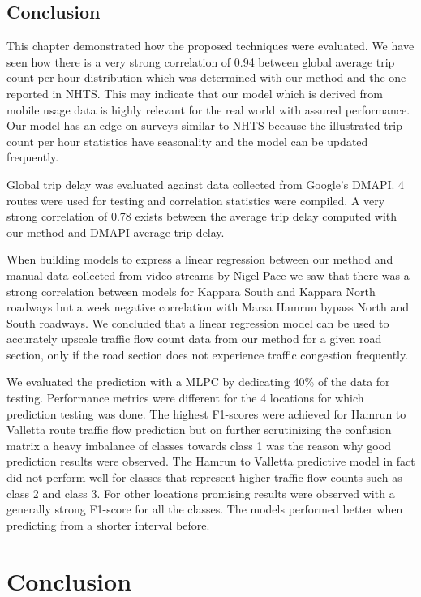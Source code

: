 \documentclass[12pt, a4paper]{report}
\theoremstyle{definition}
\theoremstyle{definition}%
\theoremstyle{definition}%
\theoremstyle{definition}%
\theoremstyle{definition}%
\theoremstyle{definition}%
\begin{document}
\section{Conclusion}

This chapter demonstrated how the proposed techniques were evaluated. We have seen how there is a very strong correlation of 0.94 between global average trip count per hour  distribution which was determined with our method and the one reported in NHTS. This may indicate that our model which is derived from mobile usage data is highly relevant for the real world with assured performance. Our model has an edge on surveys similar to NHTS because the illustrated trip count per hour statistics have seasonality and the model can be updated frequently.  

Global trip delay was evaluated against data collected from Google's DMAPI. 4 routes were used for testing and correlation statistics were compiled. A very strong correlation of 0.78 exists between the average trip delay computed with our method and DMAPI average trip delay. 

When building models to express a linear regression between our method and manual data collected from video streams by Nigel Pace we saw that there was a strong correlation between models for Kappara South and Kappara North roadways but a week negative correlation with Marsa Hamrun bypass North and South roadways. We concluded that a linear regression model can be used to accurately upscale traffic flow count data from our method for a given road section, only if the road section does not experience traffic congestion frequently.

We evaluated the prediction with a MLPC by dedicating 40\% of the data for testing. Performance metrics were different for the 4 locations for which prediction testing was done. The highest F1-scores were achieved for Hamrun to Valletta route traffic flow prediction but on further scrutinizing the confusion matrix a heavy imbalance of classes towards class 1 was the reason why good prediction results were observed. The Hamrun to Valletta predictive model in fact did not perform well for classes that represent higher traffic flow counts such as class 2 and class 3. For other locations promising results were observed with a generally strong F1-score for all the classes. The models performed better when predicting from a shorter interval before. 



\chapter{Conclusion} \label{chapter:conclusion}
\end{document}
